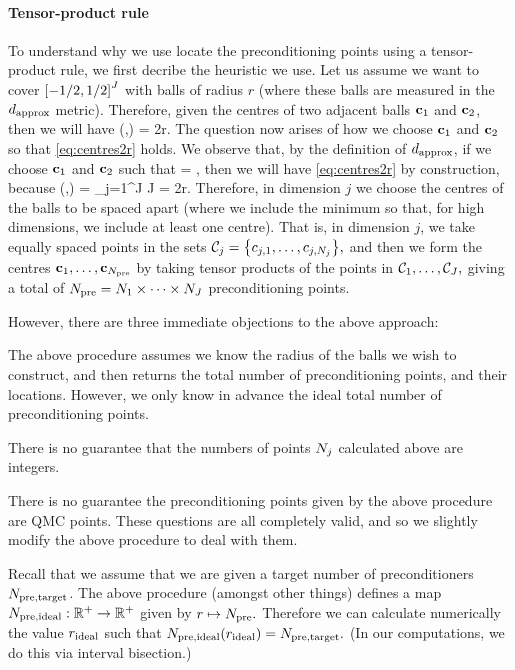 \paragraph{Tensor-product rule} To understand why we use locate the preconditioning points using a tensor-product rule, we first decribe the heuristic we use. Let us assume we want to cover $\cube{J}$ with balls of radius $r$ (where these balls are measured in the $d_{\mathrm{approx}}$ metric). Therefore, given the centres of two adjacent balls $\mathbf{c}_{1}$ and $\mathbf{c}_{2}$, then we will have
\beq\label{eq:centres2r}
\dapprox(\bcone,\bct) = 2r.
\eeq
The question now arises of how we choose $\mathbf{c}_{1}$ and $\mathbf{c}_{2}$ so that \cref{eq:centres2r} holds. We observe that, by the definition of $d_{\mathrm{approx}}$, if we choose $\mathbf{c}_{1}$ and $\mathbf{c}_{2}$ such that
\beqs
\sqrt{\lambdaj} = ,
\eeqs
then we will have \cref{eq:centres2r} by construction, because
\beqs
\dapprox(\bcone,\bct) = \sum_{j=1}^J J = 2r.
\eeqs
Therefore, in dimension $j$ we choose the centres of the balls to be spaced
\beqs
\min{}
\eeqs
apart (where we include the minimum so that, for high dimensions, we include at least one centre). That is, in dimension $j$, we take
\beqs
\Nj \de \max{}
\eeqs
equally spaced points in the sets $\centresj = \set{c_{j,1},\ldots,c_{j,\Nj}},$ and then we form the centres $\mathbf{c}_{1},\ldots,\mathbf{c}_{N_{\mathrm{pre}}}$ by taking tensor products of the points in $\mathcal C_{1},\ldots,\mathcal C_{J},$ giving a total of $N_{\mathrm{pre}} = N_{1} \times \cdots \times N_{J}$ preconditioning points.

However, there are three immediate objections to the above approach:
\ben
\item The above procedure assumes we know the radius of the balls we wish to construct, and then returns the total number of preconditioning points, and their locations. However, we only know in advance the ideal total number of preconditioning points.
\item There is no guarantee that the numbers of points $N_{j}$ calculated above are integers.
  \item There is no guarantee the preconditioning points given by the above procedure are QMC points.
    \een
    These questions are all completely valid, and so we slightly modify the above procedure to deal with them.

    Recall that we assume that we are given a target number of preconditioners $N_{\mathrm{pre,target}}$. The above procedure (amongst other things) defines a map $N_{\mathrm{pre,ideal}}:\mathbb R^{+} \rightarrow \mathbb R^{+}$ given by $r \mapsto N_{\mathrm{pre}}.$ Therefore we can calculate numerically the value $r_{\mathrm{ideal}}$ such that $N_{\mathrm{pre,ideal}}(r_{\mathrm{ideal}}) = N_{\mathrm{pre,target}}.$ (In our computations, we do this via interval bisection.)

